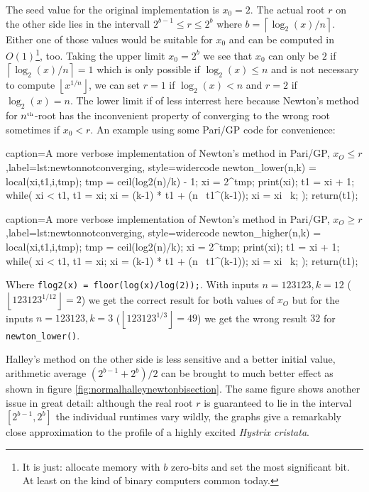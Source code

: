 \documentclass[a4paper,10pt]{report}
\providecommand{\floor}[1]{\left\lfloor#1\right\rfloor}
\providecommand{\ceil}[1]{\left\lceil#1\right\rceil}
\newcommand{\nthroot}{$n^{\text{\tiny th}}$-root}
\theoremstyle{plain} %
\theoremstyle{definition}
\theoremstyle{remark}
\begin{document}
The seed value for the original implementation is $x_0 = 2$. The actual root $r$ on the other side lies in the intervall $2^{b-1} \leq r \leq 2^b$ where $b = \ceil{\log_2(x)/n}$. Either one of those values would be suitable for $x_0$ and can be computed in $O(1)$\footnote{It is just: allocate memory with $b$ zero-bits and set the most significant bit. At least on the kind of binary computers common today.}, too. Taking the upper limit $x_0 = 2^b$ we see that $x_0$ can only be $2$ if $\ceil{\log_2(x)/n} = 1$ which is only possible if $\log_2(x) \leq n$ and is not necessary to compute $\floor{x^{1/n}}$, we can set $r = 1$ if $\log_2(x) < n$ and $r = 2$ if $\log_2(x) = n$. The lower limit if of less interrest here because Newton's method for \nthroot{} has the inconvenient property of converging to the wrong root sometimes if $x_0 < r$. An example using some Pari/GP code for convenience:

\lstset{language=parigp,style=code}
\begin{pblisting}{caption={A more verbose implementation of Newton's method in Pari/GP, $x_O \leq r$},label=lst:newtonnotconverging, style=widercode}
newton_lower(n,k) = {
   local(xi,t1,i,tmp);
   tmp = ceil(log2(n)/k) - 1;
   xi = 2^tmp;
   print(xi);
   t1 = xi + 1;
   while(
      xi < t1,
      t1 = xi;
      xi = (k-1) * t1 + (n \ t1^(k-1));
      xi = xi \ k;
   );
   return(t1);
}
\end{pblisting}
\begin{pblisting}{caption={A more verbose implementation of Newton's method in Pari/GP, $x_O \geq r$},label=lst:newtonnotconverging, style=widercode}
newton_higher(n,k) = {
   local(xi,t1,i,tmp);
   tmp = ceil(log2(n)/k);
   xi = 2^tmp;
   print(xi);
   t1 = xi + 1;
   while(
      xi < t1,
      t1 = xi;
      xi = (k-1) * t1 + (n \ t1^(k-1));
      xi = xi \ k;
   );
   return(t1);
}
\end{pblisting}
Where \lstinline!flog2(x) = floor(log(x)/log(2));!. With inputs $n = 123123, k = 12$ ($\floor{123123^{1/12}} = 2$) we get the correct result for both values of $x_O$ but for the inputs $n = 123123, k = 3$ ($\floor{123123^{1/3}} = 49$) we get the wrong result $32$ for \lstinline!newton_lower()!.

Halley's method on the other side is less sensitive and a better initial value, arithmetic average $(2^{b-1} + 2^b)/2$ can be brought to much better effect as shown in figure \ref{fig:normalhalleynewtonbisection}. The same figure shows another issue in great detail: although the real root $r$ is guaranteed to lie in the interval $[2^{b-1}, 2^b]$ the individual runtimes vary wildly, the graphs give a remarkably close approximation to the profile of a highly excited \textit{Hystrix cristata}.
\end{document}
